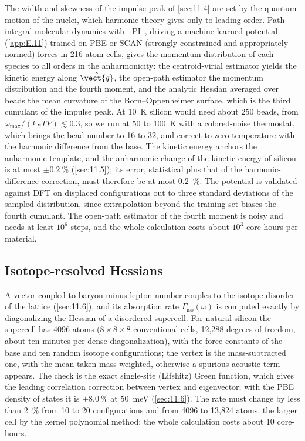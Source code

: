 The width and skewness of the impulse peak of \cref{sec:11.4} are set by the quantum motion of the nuclei, which harmonic theory gives only to leading order. Path-integral molecular dynamics with i-PI~\cite{kapil2019ipi}, driving a machine-learned potential (\cref{app:E.11}) trained on PBE or SCAN (strongly constrained and appropriately normed) forces in 216-atom cells, gives the momentum distribution of each species to all orders in the anharmonicity: the centroid-virial estimator yields the kinetic energy along $\hat{\vect{q}}$, the open-path estimator the momentum distribution and the fourth moment, and the analytic Hessian averaged over beads the mean curvature of the Born--Oppenheimer surface, which is the third cumulant of the impulse peak. At \SI{10}{K} silicon would need about 250 beads, from $\omega_{\mathrm{max}}/(k_BTP) \lesssim 0.3$, so we run at 50 to \SI{100}{K} with a colored-noise thermostat, which brings the bead number to 16 to 32, and correct to zero temperature with the harmonic difference from the base. The kinetic energy anchors the anharmonic template, and the anharmonic change of the kinetic energy of silicon is at most $\pm\SI{0.2}{\percent}$ (\cref{sec:11.5}); its error, statistical plus that of the harmonic-difference correction, must therefore be at most \SI{0.2}{\percent}. The potential is validated against DFT on displaced configurations out to three standard deviations of the sampled distribution, since extrapolation beyond the training set biases the fourth cumulant. The open-path estimator of the fourth moment is noisy and needs at least $10^6$ steps, and the whole calculation costs about $10^3$ core-hours per material.

\subsection{Isotope-resolved Hessians}

A vector coupled to baryon minus lepton number couples to the isotope disorder of the lattice (\cref{sec:11.6}), and its absorption rate $\varGamma_{\mathrm{iso}}(\omega)$ is computed exactly by diagonalizing the Hessian of a disordered supercell. For natural silicon the supercell has 4096 atoms ($8\times8\times8$ conventional cells, 12{,}288 degrees of freedom, about ten minutes per dense diagonalization), with the force constants of the base and ten random isotope configurations; the vertex is the mass-subtracted one, with the mean taken mass-weighted, otherwise a spurious acoustic term appears. The check is the exact single-site (Lifshitz) Green function, which gives the leading correlation correction between vertex and eigenvector; with the PBE density of states it is $+\SI{8.0}{\percent}$ at \SI{50}{meV} (\cref{sec:11.6}). The rate must change by less than \SI{2}{\percent} from 10 to 20 configurations and from 4096 to 13{,}824 atoms, the larger cell by the kernel polynomial method; the whole calculation costs about 10 core-hours.

